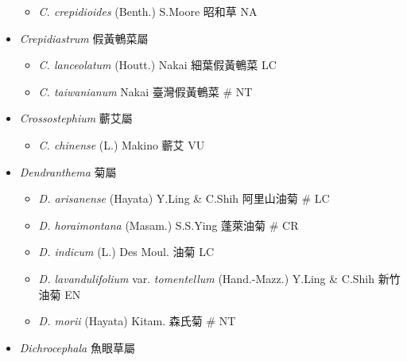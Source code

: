 \begin{itemize}
  \begin{itemize}
        \item[] \textit{C. crepidioides} (Benth.) S.Moore  昭和草   NA
  \end{itemize}
 \item[] \textit{Crepidiastrum} 假黃鵪菜屬
                                
  \begin{itemize}
        \item[] \textit{C. lanceolatum} (Houtt.) Nakai  細葉假黃鵪菜   LC
        \item[] \textit{C. taiwanianum} Nakai  臺灣假黃鵪菜  \# NT
  \end{itemize}
 \item[] \textit{Crossostephium} 蘄艾屬
                                
  \begin{itemize}
        \item[] \textit{C. chinense} (L.) Makino  蘄艾   VU
  \end{itemize}
 \item[] \textit{Dendranthema} 菊屬
                                
  \begin{itemize}
        \item[] \textit{D. arisanense} (Hayata) Y.Ling \& C.Shih  阿里山油菊  \# LC
        \item[] \textit{D. horaimontana} (Masam.) S.S.Ying  蓬萊油菊  \# CR
        \item[] \textit{D. indicum} (L.) Des Moul.  油菊   LC
        \item[] \textit{D. lavandulifolium} var. \textit{tomentellum} (Hand.-Mazz.) Y.Ling \& C.Shih  新竹油菊   EN
        \item[] \textit{D. morii} (Hayata) Kitam.  森氏菊  \# NT
  \end{itemize}
 \item[] \textit{Dichrocephala} 魚眼草屬
                                

\end{itemize}
